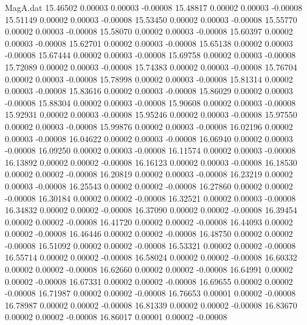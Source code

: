 \begin{filecontents}{MagA.dat}
  15.46502    0.00003    0.00003   -0.00008
  15.48817    0.00002    0.00003   -0.00008
  15.51149    0.00002    0.00003   -0.00008
  15.53450    0.00002    0.00003   -0.00008
  15.55770    0.00002    0.00003   -0.00008
  15.58070    0.00002    0.00003   -0.00008
  15.60397    0.00002    0.00003   -0.00008
  15.62701    0.00002    0.00003   -0.00008
  15.65138    0.00002    0.00003   -0.00008
  15.67444    0.00002    0.00003   -0.00008
  15.69758    0.00002    0.00003   -0.00008
  15.72089    0.00002    0.00003   -0.00008
  15.74383    0.00002    0.00003   -0.00008
  15.76704    0.00002    0.00003   -0.00008
  15.78998    0.00002    0.00003   -0.00008
  15.81314    0.00002    0.00003   -0.00008
  15.83616    0.00002    0.00003   -0.00008
  15.86029    0.00002    0.00003   -0.00008
  15.88304    0.00002    0.00003   -0.00008
  15.90608    0.00002    0.00003   -0.00008
  15.92931    0.00002    0.00003   -0.00008
  15.95246    0.00002    0.00003   -0.00008
  15.97550    0.00002    0.00003   -0.00008
  15.99876    0.00002    0.00003   -0.00008
  16.02196    0.00002    0.00003   -0.00008
  16.04622    0.00002    0.00003   -0.00008
  16.06940    0.00002    0.00003   -0.00008
  16.09250    0.00002    0.00003   -0.00008
  16.11574    0.00002    0.00003   -0.00008
  16.13892    0.00002    0.00002   -0.00008
  16.16123    0.00002    0.00003   -0.00008
  16.18530    0.00002    0.00002   -0.00008
  16.20819    0.00002    0.00003   -0.00008
  16.23219    0.00002    0.00003   -0.00008
  16.25543    0.00002    0.00002   -0.00008
  16.27860    0.00002    0.00002   -0.00008
  16.30184    0.00002    0.00002   -0.00008
  16.32521    0.00002    0.00003   -0.00008
  16.34832    0.00002    0.00002   -0.00008
  16.37090    0.00002    0.00002   -0.00008
  16.39454    0.00002    0.00002   -0.00008
  16.41720    0.00002    0.00002   -0.00008
  16.44093    0.00002    0.00002   -0.00008
  16.46446    0.00002    0.00002   -0.00008
  16.48750    0.00002    0.00002   -0.00008
  16.51092    0.00002    0.00002   -0.00008
  16.53321    0.00002    0.00002   -0.00008
  16.55714    0.00002    0.00002   -0.00008
  16.58024    0.00002    0.00002   -0.00008
  16.60332    0.00002    0.00002   -0.00008
  16.62660    0.00002    0.00002   -0.00008
  16.64991    0.00002    0.00002   -0.00008
  16.67331    0.00002    0.00002   -0.00008
  16.69655    0.00002    0.00002   -0.00008
  16.71987    0.00002    0.00002   -0.00008
  16.76653    0.00001    0.00002   -0.00008
  16.78987    0.00002    0.00002   -0.00008
  16.81339    0.00002    0.00002   -0.00008
  16.83670    0.00002    0.00002   -0.00008
  16.86017    0.00001    0.00002   -0.00008

\end{filecontents}
